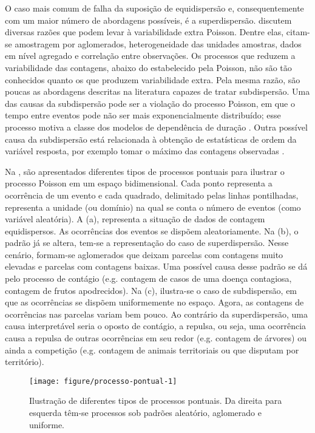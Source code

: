 \documentclass[
    oldfontcommands,
    11pt,
    openright,
    twoside,
    a4paper,
    english,
    brazil
]{abntex2}\usepackage[]{graphicx}\usepackage[]{color}
\newenvironment{knitrout}{}{} %
\begin{document}
O caso mais comum de falha da suposição de equidispersão e,
consequentemente com um maior número de abordagens possíveis, é a
superdispersão. \citet{Hinde1998} discutem diversas razões que podem
levar à variabilidade extra Poisson. Dentre elas, citam-se amostragem
por aglomerados, heterogeneidade das unidades amostras, dados em nível
agregado e correlação entre observações. Os processos que reduzem a
variabilidade das contagens, abaixo do estabelecido pela Poisson, não
são tão conhecidos quanto os que produzem variabilidade extra. Pela
mesma razão, são poucas as abordagens descritas na literatura capazes de
tratar subdispersão. Uma das causas da subdispersão pode ser a violação
do processo Poisson, em que o tempo entre eventos pode não ser mais
exponencialmente distribuído; esse processo motiva a classe dos modelos
de dependência de duração \citep{Winkelmann1995}. Outra possível causa
da subdispersão está relacionada à obtenção de estatísticas de ordem da
variável resposta, por exemplo tomar o máximo das contagens observadas
\citep{Steutel1989}.

Na , são apresentados diferentes tipos de
processos pontuais para ilustrar o processo Poisson em um espaço
bidimensional. Cada ponto representa a ocorrência de um evento e cada
quadrado, delimitado pelas linhas pontilhadas, representa a unidade (ou
domínio) na qual se conta o número de eventos (como variável
aleatória). A (a), representa a situação
de dados de contagem equidispersos. As ocorrências dos eventos se
dispõem aleatoriamente. Na (b), o padrão
já se altera, tem-se a representação do caso de superdispersão. Nesse
cenário, formam-se aglomerados que deixam parcelas com contagens muito
elevadas e parcelas com contagens baixas. Uma possível causa desse
padrão se dá pelo processo de contágio (e.g. contagem de casos de uma
doença contagiosa, contagem de frutos apodrecidos). Na
(c), ilustra-se o caso de subdispersão, em
que as ocorrências se dispõem uniformemente no espaço. Agora, as
contagens de ocorrências nas parcelas variam bem pouco. Ao contrário da
superdispersão, uma causa interpretável seria o oposto de contágio, a
repulsa, ou seja, uma ocorrência causa a repulsa de outras ocorrências
em seu redor (e.g. contagem de árvores) ou ainda a competição
(e.g. contagem de animais territoriais ou que disputam por território).

\begin{knitrout}
\color{fgcolor}\begin{figure}[!htb]

{\centering \texttt{[image: figure/processo-pontual-1]} 

}

\caption[Ilustração de diferentes tipos de processos pontuais]{Ilustração de diferentes tipos de processos pontuais. Da direita para esquerda têm-se processos sob padrões aleatório, aglomerado e uniforme.}\label{fig:processo-pontual}
\end{figure}


\end{knitrout}
\end{document}
